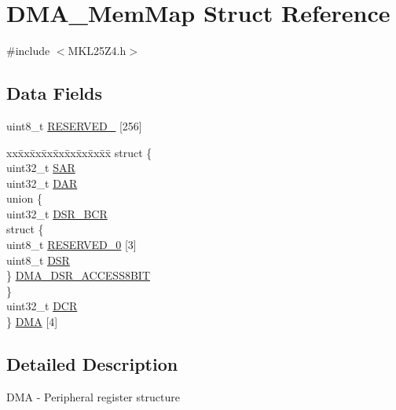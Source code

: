 \hypertarget{struct_d_m_a___mem_map}{}\section{D\+M\+A\+\_\+\+Mem\+Map Struct Reference}
\label{struct_d_m_a___mem_map}


{\ttfamily \#include $<$M\+K\+L25\+Z4.\+h$>$}

\subsection*{Data Fields}
\begin{DoxyCompactItemize}
\item 
uint8\+\_\+t \hyperlink{struct_d_m_a___mem_map_ac2655fa4a2c9e21906cf4e769379e83a}{R\+E\+S\+E\+R\+V\+E\+D\+\_} \mbox{[}256\mbox{]}
\item 
\begin{tabbing}
xx\=xx\=xx\=xx\=xx\=xx\=xx\=xx\=xx\=\kill
struct \{\\
\>uint32\_t \hyperlink{struct_d_m_a___mem_map_a800d089db050cc5c5376f4fd1b8607f4}{SAR}\\
\>uint32\_t \hyperlink{struct_d_m_a___mem_map_a22aca0a7ea6ca1da1a58f0fe6f32166f}{DAR}\\
\>union \{\\
\>\>uint32\_t \hyperlink{struct_d_m_a___mem_map_ad1e76cea4d92082ca9ed0d760ce5cefe}{DSR\_BCR}\\
\>\>struct \{\\
\>\>\>uint8\_t \hyperlink{struct_d_m_a___mem_map_ac2655fa4a2c9e21906cf4e769379e83a}{RESERVED\_0} \mbox{[}3\mbox{]}\\
\>\>\>uint8\_t \hyperlink{struct_d_m_a___mem_map_a386ac5fd0aa8748b87f2de231c917b07}{DSR}\\
\>\>\} \hyperlink{struct_d_m_a___mem_map_a7f349cbaa84a7664aa61aa115338ffa3}{DMA\_DSR\_ACCESS8BIT}\\
\>\} \\
\>uint32\_t \hyperlink{struct_d_m_a___mem_map_a844c0fef8183d262baec56c84a07c070}{DCR}\\
\} \hyperlink{struct_d_m_a___mem_map_a03afa3f1b88380a72aee5aa4aec927e9}{DMA} \mbox{[}4\mbox{]}\\

\end{tabbing}\end{DoxyCompactItemize}


\subsection{Detailed Description}
D\+MA -\/ Peripheral register structure 

